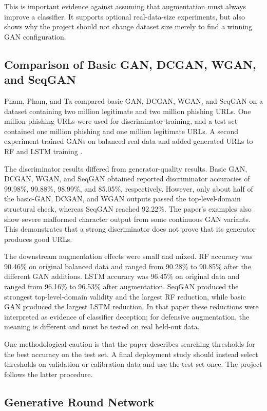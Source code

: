 This is important evidence against assuming that augmentation must always
improve a classifier. It supports optional real-data-size experiments, but also
shows why the project should not change dataset size merely to find a winning
GAN configuration.

\subsection{Comparison of Basic GAN, DCGAN, WGAN, and SeqGAN}

Pham, Pham, and Ta compared basic GAN, DCGAN, WGAN, and SeqGAN on a dataset
containing two million legitimate and two million phishing URLs. One million
phishing URLs were used for discriminator training, and a test set contained
one million phishing and one million legitimate URLs. A second experiment
trained GANs on balanced real data and added generated URLs to RF and LSTM
training \citep{pham2023evaluation}.

The discriminator results differed from generator-quality results. Basic GAN,
DCGAN, WGAN, and SeqGAN obtained reported discriminator accuracies of 99.98\%,
99.88\%, 98.99\%, and 85.05\%, respectively. However, only about half of the
basic-GAN, DCGAN, and WGAN outputs passed the top-level-domain structural check,
whereas SeqGAN reached 92.22\%. The paper's examples also show severe malformed
character output from some continuous GAN variants. This demonstrates that a
strong discriminator does not prove that its generator produces good URLs.

The downstream augmentation effects were small and mixed. RF accuracy was
90.46\% on original balanced data and ranged from 90.28\% to 90.85\% after the
different GAN additions. LSTM accuracy was 96.45\% on original data and ranged
from 96.16\% to 96.53\% after augmentation. SeqGAN produced the strongest
top-level-domain validity and the largest RF reduction, while basic GAN produced
the largest LSTM reduction. In that paper these reductions were interpreted as
evidence of classifier deception; for defensive augmentation, the meaning is
different and must be tested on real held-out data.

One methodological caution is that the paper describes searching thresholds
for the best accuracy on the test set. A final deployment study should instead
select thresholds on validation or calibration data and use the test set once.
The project follows the latter procedure.

\subsection{Generative Round Network}

